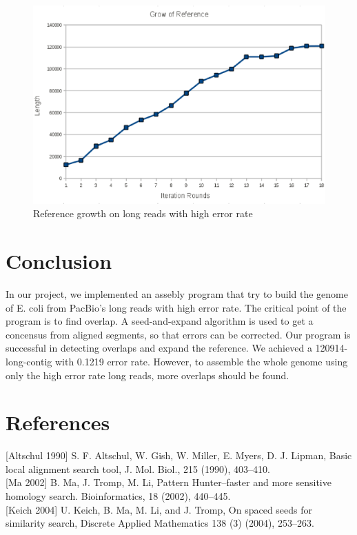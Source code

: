 \documentclass{article}
\begin{document}
\begin{figure}[t]
    \includegraphics[width=12.5cm, keepaspectratio=true]{real.eps}
    \caption{\label{fig:real}Reference growth on long reads with high error rate}
\end{figure}

\section{Conclusion}

In our project, we implemented an assebly program that try to build the genome
of E. coli from PacBio's long reads with high error rate. The critical point of
the program is to find overlap. A seed-and-expand algorithm is used to get a
concensus from aligned segments, so that errors can be corrected. Our program is
successful in detecting overlaps and expand the reference. We achieved a
120914-long-contig with 0.1219 error rate. However, to assemble the whole genome
using only the high error rate long reads, more overlaps should be found.

\section{References}

{[}Altschul 1990{]} S. F. Altschul, W. Gish, W. Miller, E. Myers, D. J.
Lipman, Basic local alignment search tool, J. Mol. Biol., 215 (1990),
403--410. \\

{[}Ma 2002{]} B. Ma, J. Tromp, M. Li, Pattern Hunter--faster and more
sensitive homology search. Bioinformatics, 18 (2002), 440--445. \\

{[}Keich 2004{]} U. Keich, B. Ma, M. Li, and J. Tromp, On spaced seeds
for similarity search, Discrete Applied Mathematics 138 (3) (2004),
253--263. \\
\end{document}
